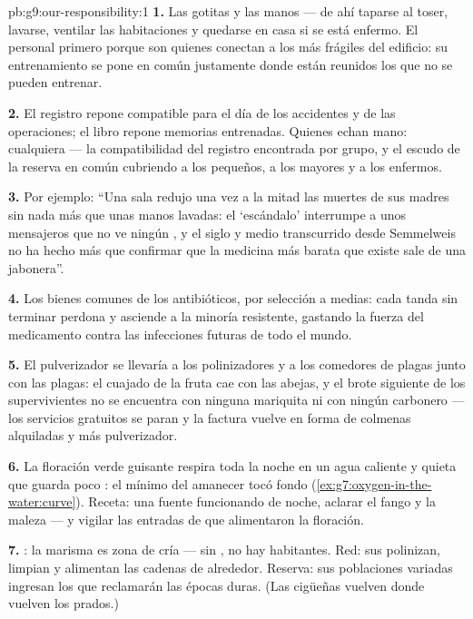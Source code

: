 \begin{solution}{pb:g9:our-responsibility:1}
\textbf{1.} Las gotitas y las manos --- de ahí taparse al toser,
lavarse, ventilar las habitaciones y quedarse en casa si se está
enfermo. El personal primero porque son quienes conectan a los más
frágiles del edificio: su entrenamiento se pone en común justamente
donde están reunidos los que no se pueden entrenar.

\textbf{2.} El registro repone  compatible para el día de los
accidentes y de las operaciones; el libro repone memorias entrenadas.
Quienes echan mano: cualquiera --- la compatibilidad del registro
encontrada por grupo, y el escudo de la reserva en común cubriendo a
los pequeños, a los mayores y a los enfermos.

\textbf{3.} Por ejemplo: ``Una sala redujo una vez a la mitad las
muertes de sus madres sin nada más que unas manos lavadas: el
`escándalo' interrumpe a unos mensajeros que no ve ningún , y el
siglo y medio transcurrido desde Semmelweis no ha hecho más que
confirmar que la medicina más barata que existe sale de una
jabonera''.

\textbf{4.} Los bienes comunes de los antibióticos, por selección a
medias: cada tanda sin terminar perdona y asciende a la minoría
resistente, gastando la fuerza del medicamento contra las infecciones
futuras de todo el mundo.

\textbf{5.} El pulverizador se llevaría a los polinizadores y a los
comedores de plagas junto con las plagas: el cuajado de la fruta cae
con las abejas, y el brote siguiente de los supervivientes no se
encuentra con ninguna mariquita ni con ningún carbonero --- los
servicios gratuitos se paran y la factura vuelve en forma de colmenas
alquiladas y más pulverizador.

\textbf{6.} La floración verde guisante respira toda la noche en un
agua caliente y quieta que guarda poco : el mínimo del amanecer
tocó fondo (\cref{ex:g7:oxygen-in-the-water:curve}). Receta: una fuente
funcionando de noche, aclarar el fango y la maleza --- y vigilar las
entradas de  que alimentaron la floración.

\textbf{7.} : la marisma es zona de cría --- sin , no hay
habitantes. Red: sus  polinizan, limpian y alimentan las
cadenas de alrededor. Reserva: sus poblaciones variadas ingresan los
 que reclamarán las épocas duras. (Las cigüeñas vuelven donde
vuelven los prados.)


\end{solution}
